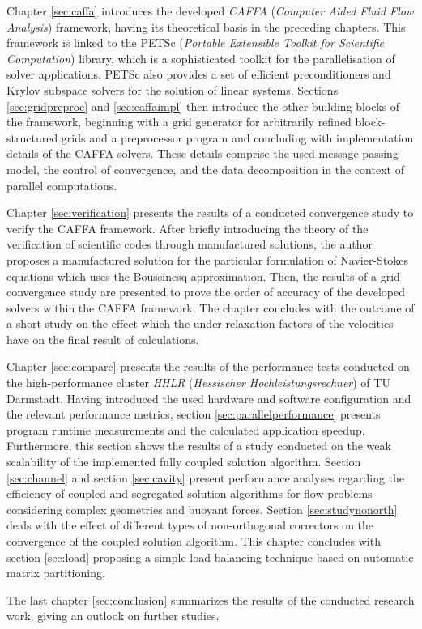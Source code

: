 Chapter \ref{sec:caffa} introduces the developed \emph{CAFFA} (\emph{Computer Aided Fluid Flow Analysis}) framework, having its theoretical basis in the preceding chapters. This framework is linked to the PETSc (\emph{Portable Extensible Toolkit for Scientific Computation}) library, which is a sophisticated toolkit for the parallelisation of solver applications. PETSc also provides a set of efficient preconditioners and Krylov subspace solvers for the solution of linear systems. Sections \ref{sec:gridpreproc} and \ref{sec:caffaimpl} then introduce the other building blocks of the framework, beginning with a grid generator for arbitrarily refined block-structured grids and a preprocessor program and concluding with implementation details of the CAFFA solvers. These details comprise the used message passing model, the control of convergence, and the data decomposition in the context of parallel computations.

Chapter \ref{sec:verification} presents the results of a conducted convergence study to verify the CAFFA framework. After briefly introducing the theory of the verification of scientific codes through manufactured solutions, the author proposes a manufactured solution for the particular formulation of Navier-Stokes equations which uses the Boussinesq approximation. Then, the results of a grid convergence study are presented to prove the order of accuracy of the developed solvers within the CAFFA framework. The chapter concludes with the outcome of a short study on the effect which the under-relaxation factors of the velocities have on the final result of calculations.

Chapter \ref{sec:compare} presents the results of the performance tests conducted on the high-performance cluster \emph{HHLR} (\emph{Hessischer Hochleistungsrechner}) of TU Darmstadt. Having introduced the used hardware and software configuration and the relevant performance metrics, section \ref{sec:parallelperformance} presents program runtime measurements and the calculated application speedup. Furthermore, this section shows the results of a study conducted on the weak scalability of the implemented fully coupled solution algorithm. Section \ref{sec:channel} and section \ref{sec:cavity} present performance analyses regarding the efficiency of coupled and segregated solution algorithms for flow problems considering complex geometries and buoyant forces. Section \ref{sec:studynonorth} deals with the effect of different types of non-orthogonal correctors on the convergence of the coupled solution algorithm. This chapter concludes with section \ref{sec:load} proposing a simple load balancing technique based on automatic matrix partitioning.

The last chapter \ref{sec:conclusion} summarizes the results of the conducted research work, giving an outlook on further studies.

